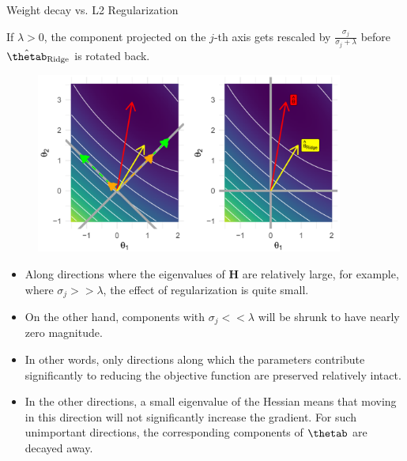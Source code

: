 \begin{vbframe}{Weight decay vs. L2 Regularization}
\framebreak
  
If $\lambda > 0$, the component projected on the $j$-th axis gets rescaled by $\frac{\sigma_j}{\sigma_j + \lambda}$ before $\hat{\thetab}_{\text{Ridge}}$ is rotated back.

\begin{figure}
\includegraphics[width=0.9\textwidth]{figure_man/L2-regularization05.png}\\
\end{figure}


\framebreak

  
\begin{itemize} 
  \item Along directions where the eigenvalues of $\bm{H}$ are relatively large, for example, where $\sigma_j >> \lambda$, the effect of regularization is quite small.
  \item On the other hand, components with $\sigma_j << \lambda$ will be shrunk to have nearly zero magnitude.
  \item In other words, only directions along which the parameters contribute significantly to reducing the objective function are preserved relatively intact.
  \item In the other directions, a small eigenvalue of the Hessian means that moving in this direction will not significantly increase the gradient. For such unimportant directions, the corresponding components of $\thetab$ are decayed away.
  \end{itemize}
  
  \framebreak
  

\end{vbframe}
